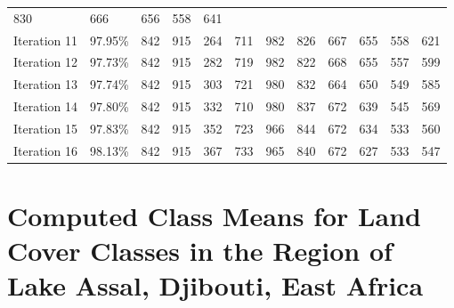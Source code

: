\documentclass[jimaging,article,accept,pdftex,moreauthors]{Definitions/mdpi}
\begin{document}
\begin{table}[H]
\begin{tabularx}{\textwidth}{p{1.6cm}p{1.8cm}p{0.55cm}p{0.55cm}p{0.55cm}p{0.55cm}p{0.55cm}p{0.55cm}p{0.55cm}p{0.55cm}p{0.55cm}p{0.9cm}}
        830    &    666   &     656     &   558    &    641 \\
    Iteration 11 & 97.95\% & 842      &  915  &      264    &    711    &    982 &
        826  &      667  &      655     &   558   &     621 \\
    Iteration 12 & 97.73\% & 842    &    915    &    282   &     719 &        982 &
        822  &      668     &   655    &    557   &     599 \\
    Iteration 13 & 97.74\% & 842   &     915  &      303  &      721    &    980 &
        832     &   664  &      650     &   549    &    585 \\
    Iteration 14 & 97.80\% &  842   &     915   &     332    &    710 &       980 &
        837   &     672     &    639    &    545   &     569 \\
    Iteration 15 & 97.83\% & 842     &   915   &     352    &    723   &     966 &
        844    &    672  &      634     &   533    &    560 \\
    Iteration 16 & 98.13\% & 842   &     915     &   367     &   733 &       965 &
        840    &    672  &       627   &     533    &    547 \\
\bottomrule
\end{tabularx}
 
  \label{tabB4}
\end{table}

\section[\appendixname~\thesection]{Computed Class Means for Land Cover Classes in the Region of Lake Assal, Djibouti, East Africa}\label{AppC}
\end{document}

